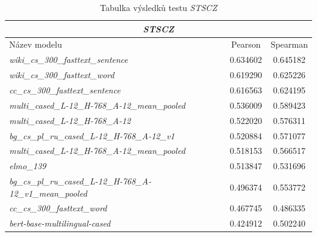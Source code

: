 \documentclass[thesis=M,czech]{FITthesis}[2019/12/23]
\begin{document}
\begin{table}[h!]
\centering
\begin{tabular}{ |l|c|c| }
 \hline
 \multicolumn{3}{|c|}{\textit{STSCZ}} \\\hline
 \hline
  Název modelu & Pearson & Spearman \\\hline
\textit{wiki\_cs\_300\_fasttext\_sentence} & 0.634602 &	0.645182\\
\textit{wiki\_cs\_300\_fasttext\_word} & 0.619290 & 0.625226\\
\textit{cc\_cs\_300\_fasttext\_sentence} & 0.616563 & 0.624195\\
\textit{multi\_cased\_L-12\_H-768\_A-12\_mean\_pooled} & 0.536009 & 0.589423\\\hline
\textit{multi\_cased\_L-12\_H-768\_A-12} & 0.522020 & 0.576311\\
\textit{bg\_cs\_pl\_ru\_cased\_L-12\_H-768\_A-12\_v1} & 0.520884 & 0.571077\\
\textit{multi\_cased\_L-12\_H-768\_A-12\_mean\_pooled} & 0.518153 & 0.566517\\
\textit{elmo\_139} & 0.513847 & 0.531696\\\hline
\textit{bg\_cs\_pl\_ru\_cased\_L-12\_H-768\_A-12\_v1\_mean\_pooled} & 0.496374 & 0.553772\\
\textit{cc\_cs\_300\_fasttext\_word} & 0.467745 & 0.486335\\
\textit{bert-base-multilingual-cased} & 0.424912 & 0.502240\\\hline
\end{tabular}
\caption{Tabulka výsledků testu \textit{STSCZ}}
\label{table:STSCZ}
\end{table}
\end{document}

